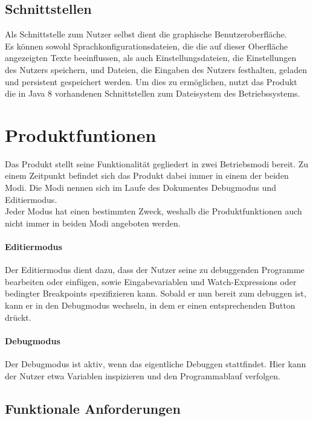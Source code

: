 \documentclass[parskip=full]{scrartcl}
\begin{document}
\subsection{Schnittstellen}
Als Schnittstelle zum Nutzer selbst dient die graphische Benutzeroberfläche. \\ Es können sowohl Sprachkonfigurationsdateien, die die auf dieser Oberfläche angezeigten Texte beeinflussen, als auch Einstellungsdateien, die Einstellungen des Nutzers speichern, und Dateien, die Eingaben des Nutzers festhalten, geladen und persistent gespeichert werden. Um dies zu ermöglichen, nutzt das Produkt die in Java 8 vorhandenen Schnittstellen zum Dateisystem des Betriebssystems. 


\section{Produktfuntionen}
Das Produkt stellt seine Funktionalität gegliedert in zwei Betriebsmodi bereit. Zu einem Zeitpunkt befindet sich das Produkt dabei immer in einem der beiden Modi. Die Modi nennen sich im Laufe des Dokumentes \gls{Debugmodus} und \gls{Editiermodus}. \\ Jeder Modus hat einen bestimmten Zweck, weshalb die Produktfunktionen auch nicht immer in beiden Modi angeboten werden. 
\paragraph{Editiermodus} Der \gls{Editiermodus} dient dazu, dass der Nutzer seine zu debuggenden Programme bearbeiten oder einfügen, sowie Eingabevariablen und \glspl{Watch-Expression} oder \glspl{bedingter Breakpoint} spezifizieren kann. Sobald er nun bereit zum debuggen ist, kann er in den Debugmodus wechseln, in dem er einen entsprechenden Button drückt. 
\paragraph{Debugmodus} Der \gls{Debugmodus} ist aktiv, wenn das eigentliche Debuggen stattfindet. Hier kann der Nutzer etwa Variablen inspizieren und den Programmablauf verfolgen. 
	 	\subsection{Funktionale Anforderungen}
\end{document}
